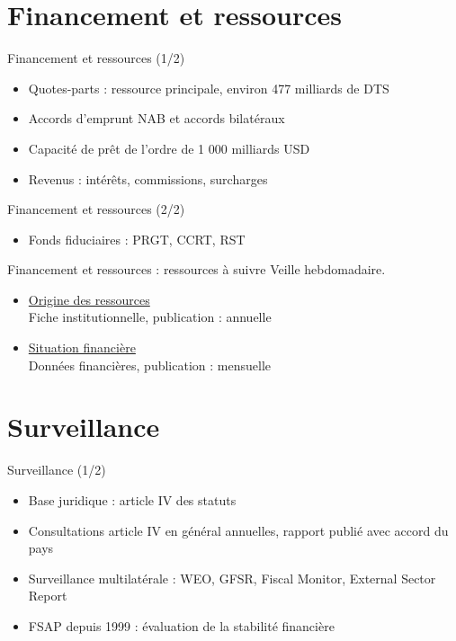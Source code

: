 \documentclass[aspectratio=169,11pt]{beamer}
\begin{document}
\section{Financement et ressources}
\begin{frame}{Financement et ressources (1/2)}
\begin{itemize}
\item Quotes-parts : ressource principale, environ 477 milliards de DTS
\item Accords d'emprunt NAB et accords bilatéraux
\item Capacité de prêt de l'ordre de 1 000 milliards USD
\item Revenus : intérêts, commissions, surcharges
\end{itemize}
\end{frame}

\begin{frame}{Financement et ressources (2/2)}
\begin{itemize}
\item Fonds fiduciaires : PRGT, CCRT, RST
\end{itemize}
\end{frame}

\begin{frame}{Financement et ressources : ressources à suivre}
\small
Veille hebdomadaire.
\begin{itemize}
\item \href{https://www.imf.org/en/About/Factsheets/Sheets/2023/Where-the-IMF-gets-its-money}{Origine des ressources}\\{\footnotesize Fiche institutionnelle, publication : annuelle}
\item \href{https://www.imf.org/external/np/fin/tad/extarr2.aspx}{Situation financière}\\{\footnotesize Données financières, publication : mensuelle}
\end{itemize}
\end{frame}

\section{Surveillance}
\begin{frame}{Surveillance (1/2)}
\begin{itemize}
\item Base juridique : article IV des statuts
\item Consultations article IV en général annuelles, rapport publié avec accord du pays
\item Surveillance multilatérale : WEO, GFSR, Fiscal Monitor, External Sector Report
\item FSAP depuis 1999 : évaluation de la stabilité financière
\end{itemize}
\end{frame}
\end{document}
